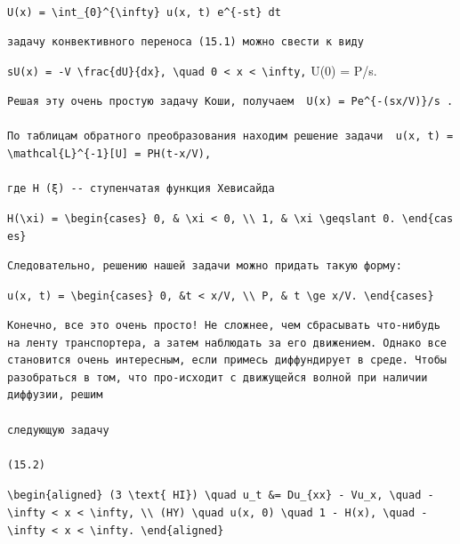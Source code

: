 \documentclass[
  ukrainian,
]{article}
\begin{document}
\texttt{U(x)\ =\ \textbackslash{}int\_\{0\}\^{}\{\textbackslash{}infty\}\ u(x,\ t)\ e\^{}\{-st\}\ dt}

\begin{verbatim}
задачу конвективного переноса (15.1) можно свести к виду
\end{verbatim}

\texttt{sU(x)\ =\ -V\ \textbackslash{}frac\{dU\}\{dx\},\ \textbackslash{}quad\ 0\ \textless{}\ x\ \textless{}\ \textbackslash{}infty,}
U(0) = P/s.

\begin{verbatim}
Решая эту очень простую задачу Коши, получаем  U(x) = Pe^{-(sx/V)}/s .

По таблицам обратного преобразования находим решение задачи  u(x, t) = \mathcal{L}^{-1}[U] = PH(t-x/V), 

где Н (ξ) -- ступенчатая функция Хевисайда
\end{verbatim}

\texttt{H(\textbackslash{}xi)\ =\ \textbackslash{}begin\{cases\}\ 0,\ \&\ \textbackslash{}xi\ \textless{}\ 0,\ \textbackslash{}\textbackslash{}\ 1,\ \&\ \textbackslash{}xi\ \textbackslash{}geqslant\ 0.\ \textbackslash{}end\{cases\}}

\begin{verbatim}
Следовательно, решению нашей задачи можно придать такую форму:
\end{verbatim}

\texttt{u(x,\ t)\ =\ \textbackslash{}begin\{cases\}\ 0,\ \&t\ \textless{}\ x/V,\ \textbackslash{}\textbackslash{}\ P,\ \&\ t\ \textbackslash{}ge\ x/V.\ \textbackslash{}end\{cases\}}

\begin{verbatim}
Конечно, все это очень просто! Не сложнее, чем сбрасывать что-нибудь на ленту транспортера, а затем наблюдать за его движением. Однако все становится очень интересным, если примесь диффундирует в среде. Чтобы разобраться в том, что про-исходит с движущейся волной при наличии диффузии, решим

следующую задачу

(15.2)
\end{verbatim}

\texttt{\textbackslash{}begin\{aligned\}\ (3\ \textbackslash{}text\{\ HI\})\ \textbackslash{}quad\ u\_t\ \&=\ Du\_\{xx\}\ -\ Vu\_x,\ \textbackslash{}quad\ -\textbackslash{}infty\ \textless{}\ x\ \textless{}\ \textbackslash{}infty,\ \textbackslash{}\textbackslash{}\ (HY)\ \textbackslash{}quad\ u(x,\ 0)\ \textbackslash{}quad\ 1\ -\ H(x),\ \textbackslash{}quad\ -\textbackslash{}infty\ \textless{}\ x\ \textless{}\ \textbackslash{}infty.\ \textbackslash{}end\{aligned\}}
\end{document}

